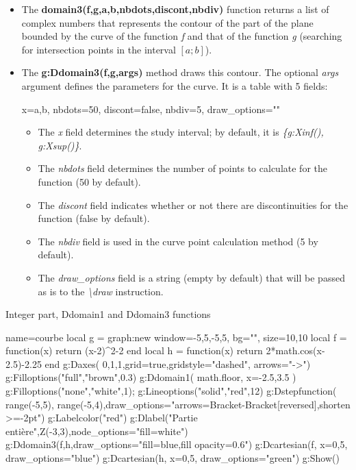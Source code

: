 \begin{itemize}
    \item The \textbf{domain3(f,g,a,b,nbdots,discont,nbdiv)} function returns a list of complex numbers that represents the contour of the part of the plane bounded by the curve of the function \emph{f} and that of the function \emph{g} (searching for intersection points in the interval $[a;b]$).

    \item The \textbf{g:Ddomain3(f,g,args)} method draws this contour. The optional \emph{args} argument defines the parameters for the curve. It is a table with 5 fields:

\begin{TeXcode}
{ x={a,b}, nbdots=50, discont=false, nbdiv=5, draw_options="" }
\end{TeXcode}

\begin{itemize}
    \item The \emph{x} field determines the study interval; by default, it is \emph{\{g:Xinf(), g:Xsup()\}}.
    \item The \emph{nbdots} field determines the number of points to calculate for the function (50 by default).
    \item The \emph{discont} field indicates whether or not there are discontinuities for the function (false by default).     \item The \emph{nbdiv} field is used in the curve point calculation method (5 by default).
    \item The \emph{draw\_options} field is a string (empty by default) that will be passed as is to the \emph{\textbackslash draw} instruction.
\end{itemize}
\end{itemize}

\begin{demo}{Integer part, Ddomain1 and Ddomain3 functions}
\begin{luadraw}{name=courbe}
local g = graph:new{ window={-5,5,-5,5}, bg="", size={10,10} }
local f = function(x) return (x-2)^2-2 end
local h = function(x) return 2*math.cos(x-2.5)-2.25 end
g:Daxes( {0,1,1},{grid=true,gridstyle="dashed", arrows="->"})
g:Filloptions("full","brown",0.3)
g:Ddomain1( math.floor, { x={-2.5,3.5} })
g:Filloptions("none","white",1); g:Lineoptions("solid","red",12)
g:Dstepfunction( {range(-5,5), range(-5,4)},{draw_options="arrows={Bracket-Bracket[reversed]},shorten >=-2pt"})
g:Labelcolor("red")
g:Dlabel("Partie entière",Z(-3,3),{node_options="fill=white"})
g:Ddomain3(f,h,{draw_options="fill=blue,fill opacity=0.6"})
g:Dcartesian(f, {x={0,5}, draw_options="blue"})
g:Dcartesian(h, {x={0,5}, draw_options="green"})
g:Show()
\end{luadraw}
\end{demo}


